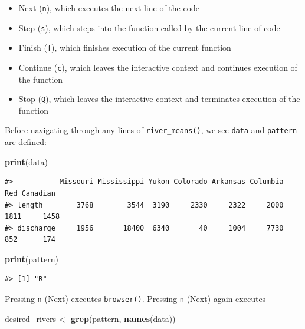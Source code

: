 \documentclass[
]{book}
\newenvironment{Shaded}{\begin{snugshade}}{\end{snugshade}}
\newcommand{\KeywordTok}[1]{\textcolor[rgb]{0.13,0.29,0.53}{\textbf{#1}}}
\newcommand{\NormalTok}[1]{#1}
\newcommand{\StringTok}[1]{\textcolor[rgb]{0.31,0.60,0.02}{#1}}
\providecommand{\tightlist}{%
  \setlength{\itemsep}{0pt}\setlength{\parskip}{0pt}}
\begin{document}
\begin{itemize}
\tightlist
\item
  Next (\texttt{n}), which executes the next line of the code
\item
  Step (\texttt{s}), which steps into the function called by the current line of code
\item
  Finish (\texttt{f}), which finishes execution of the current function
\item
  Continue (\texttt{c}), which leaves the interactive context and continues execution of the function
\item
  Stop (\texttt{Q}), which leaves the interactive context and terminates execution of the function
\end{itemize}

Before navigating through any lines of \texttt{river\_means()}, we see \texttt{data} and \texttt{pattern} are defined:

\begin{Shaded}
\begin{Highlighting}[]
\KeywordTok{print}\NormalTok{(data)}
\end{Highlighting}
\end{Shaded}

\begin{verbatim}
#>           Missouri Mississippi Yukon Colorado Arkansas Columbia  Red Canadian
#> length        3768        3544  3190     2330     2322     2000 1811     1458
#> discharge     1956       18400  6340       40     1004     7730  852      174
\end{verbatim}

\begin{Shaded}
\begin{Highlighting}[]
\KeywordTok{print}\NormalTok{(pattern)}
\end{Highlighting}
\end{Shaded}

\begin{verbatim}
#> [1] "R"
\end{verbatim}

Pressing \texttt{n} (Next) executes \texttt{browser()}. Pressing \texttt{n} (Next) again executes

\begin{Shaded}
\begin{Highlighting}[]
\NormalTok{desired_rivers <-}\StringTok{ }\KeywordTok{grep}\NormalTok{(pattern, }\KeywordTok{names}\NormalTok{(data))}
\end{Highlighting}
\end{Shaded}
\end{document}
